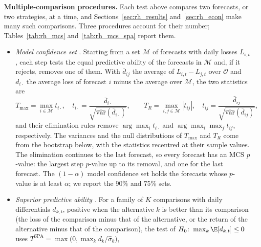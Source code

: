 \item \textbf{Multiple-comparison procedures.} Each test above compares two forecasts, or two strategies, at a time,
  and Sections~\ref{sec:rh_results} and~\ref{sec:rh_econ} make many such comparisons. Three procedures account for
  their number; Tables~\ref{tab:rh_mcs} and~\ref{tab:rh_mcs_spa} report them.
  \begin{itemize}
  \item \emph{Model confidence set} \citep{HansenLundeNason2011}. Starting from a set $\mathcal M$ of forecasts with
    daily losses $L_{i,t}$, each step tests the equal predictive ability of the forecasts in $\mathcal M$ and, if it
    rejects, removes one of them. With $\bar d_{ij}$ the average of $L_{i,t} - L_{j,t}$ over $\mathcal O$ and
    $\bar d_{i\cdot}$ the average loss of forecast $i$ minus the average over $\mathcal M$, the two statistics are
    \[
      T_{\max} = \max_{i \in \mathcal M} t_{i\cdot}, \quad
      t_{i\cdot} = \frac{\bar d_{i\cdot}}{\sqrt{\widehat{\mathrm{var}}(\bar d_{i\cdot})}},
      \qquad
      T_R = \max_{i, j \in \mathcal M} |t_{ij}|, \quad
      t_{ij} = \frac{\bar d_{ij}}{\sqrt{\widehat{\mathrm{var}}(\bar d_{ij})}},
    \]
    and their elimination rules remove $\arg\max_i t_{i\cdot}$ and $\arg\max_i \max_j t_{ij}$, respectively. The
    variances and the null distributions of $T_{\max}$ and $T_R$ come from the bootstrap below, with the statistics
    recentred at their sample values. The elimination continues to the last forecast, so every forecast has an MCS
    $p$-value: the largest step $p$-value up to its removal, and one for the last forecast. The $(1-\alpha)$ model
    confidence set holds the forecasts whose $p$-value is at least $\alpha$; we report the 90\% and 75\% sets.
  \item \emph{Superior predictive ability} \citep{Hansen2005}. For a family of $K$ comparisons with daily
    differentials $d_{k,t}$, positive when the alternative $k$ is better than its comparison (the loss of the
    comparison minus that of the alternative, or the return of the alternative minus that of the comparison), the
    test of $H_0\colon \max_k \E[d_{k,t}] \le 0$ uses $T^{\mathrm{SPA}} = \max\bigl(0, \max_k \bar d_k/\hat\sigma_k\bigr)$,

\end{itemize}
